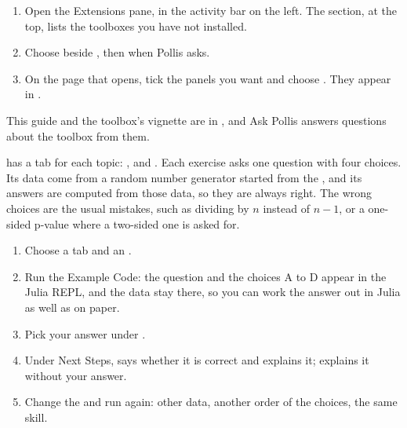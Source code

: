 \begin{enumerate}[label=\arabic*.]
  \item Open the Extensions pane, in the activity bar on the left. The  section, at the
    top, lists the toolboxes you have not installed.
  \item Choose  beside , then 
    when Pollis asks.
  \item On the  page that opens, tick the panels you want and choose
    . They appear in .
\end{enumerate}
This guide and the toolbox's vignette are in , and Ask Pollis
answers questions about the toolbox from them.

 has a tab for each topic:
,  and . Each
exercise asks one question with four choices. Its data come from a random number generator started from
the , and its answers are computed from those data, so they are always right. The wrong choices
are the usual mistakes, such as dividing by $n$ instead of $n-1$, or a one-sided p-value where a two-sided
one is asked for.
\begin{enumerate}[label=\arabic*.]
  \item Choose a tab and an .
  \item Run the Example Code: the question and the choices A to D appear in the Julia REPL, and the data stay
    there, so you can work the answer out in Julia as well as on paper.
  \item Pick your answer under .
  \item Under Next Steps,  says whether it is correct and explains it;
     explains it without your answer.
  \item Change the  and run again: other data, another order of the choices, the same skill.
\end{enumerate}

